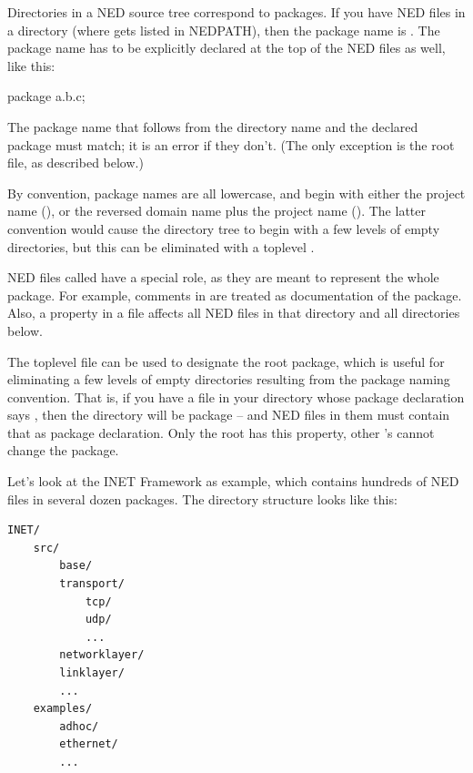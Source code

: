 Directories in a NED source tree correspond to packages. If you have
NED files in a  directory (where 
gets listed in NEDPATH), then the package name is .
The package name has to be explicitly declared at the top of the NED
files as well, like this:

\begin{ned}
package a.b.c;
\end{ned}

The package name that follows from the directory name and the declared
package must match; it is an error if they don't. (The only exception
is the root  file, as described below.)

By convention, package names are all lowercase, and begin with either
the project name (), or the reversed domain name plus the
project name (). The latter convention
would cause the directory tree to begin with a few levels of empty
directories, but this can be eliminated with a toplevel .

NED files called  have a special role, as they are meant
to represent the whole package. For example, comments in
 are treated as documentation of the package. Also, a
 property in a  file affects all NED
files in that directory and all directories below.

The toplevel  file can be used to designate the root
package, which is useful for eliminating a few levels of empty directories
resulting from the package naming convention. That is, if you have a
 file in your  directory whose package
declaration says , then the 
directory will be package  -- and NED
files in them must contain that as package declaration. Only the root
 has this property, other 's cannot
change the package.

Let's look at the INET Framework as example, which contains hundreds of NED
files in several dozen packages. The directory structure looks like this:

\begin{Verbatim}
INET/
    src/
        base/
        transport/
            tcp/
            udp/
            ...
        networklayer/
        linklayer/
        ...
    examples/
        adhoc/
        ethernet/
        ...
\end{Verbatim}

